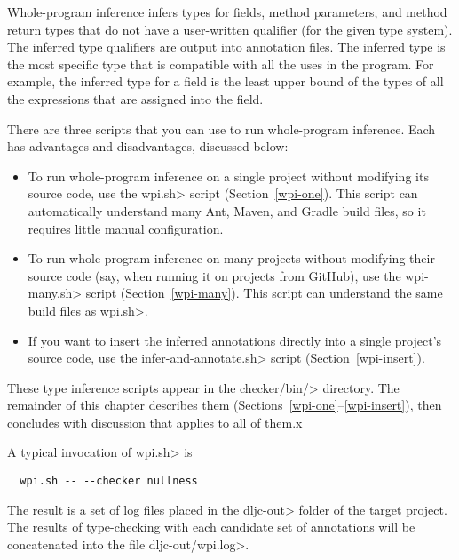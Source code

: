 
Whole-program inference
infers types for fields, method parameters, and method return types that do not
have a user-written qualifier (for the given type system).
The inferred type qualifiers are output into annotation files.
The inferred type is the most specific type that is compatible with all the
uses in the program.  For example, the inferred type for a field is the
least upper bound of the types of all the expressions that are assigned
into the field.

There are three scripts that you can use to run whole-program inference.
Each has advantages and disadvantages, discussed below:

\begin{itemize}
    \item
    To run whole-program inference on a single project without modifying its source code,
    use the \<wpi.sh> script (Section~\ref{wpi-one}). This script can automatically understand
    many Ant, Maven, and Gradle build files, so it requires little manual configuration.

    \item
    To run whole-program inference on many projects without modifying their source code
    (say, when running it on projects from GitHub), use the \<wpi-many.sh> script (Section~\ref{wpi-many}).
    This script can understand the same build files as \<wpi.sh>.

    \item
    If you want to insert the inferred annotations directly into a single
    project's source code, use the \<infer-and-annotate.sh> script (Section~\ref{wpi-insert}).
\end{itemize}

These type inference scripts appear in the \<checker/bin/> directory.
The remainder of this chapter describes them
(Sections~\ref{wpi-one}--\ref{wpi-insert}), then concludes with discussion
that applies to all of them.x



A typical invocation of \<wpi.sh> is

\begin{Verbatim}
  wpi.sh -- --checker nullness
\end{Verbatim}

The result is a set of log files placed in the \<dljc-out> folder of the
target project. The results of type-checking with each candidate set of
annotations will be concatenated into the file \<dljc-out/wpi.log>.

